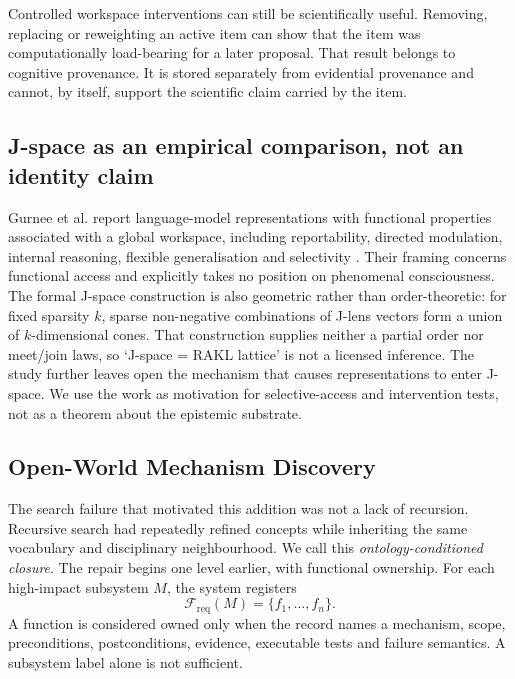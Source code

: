 Controlled workspace interventions can still be scientifically useful. Removing, replacing or reweighting an active item can show that the item was computationally load-bearing for a later proposal. That result belongs to cognitive provenance. It is stored separately from evidential provenance and cannot, by itself, support the scientific claim carried by the item.

\subsection{J-space as an empirical comparison, not an identity claim}

Gurnee et al. report language-model representations with functional properties associated with a global workspace, including reportability, directed modulation, internal reasoning, flexible generalisation and selectivity \cite{gurnee2026}. Their framing concerns functional access and explicitly takes no position on phenomenal consciousness. The formal J-space construction is also geometric rather than order-theoretic: for fixed sparsity \(k\), sparse non-negative combinations of J-lens vectors form a union of \(k\)-dimensional cones. That construction supplies neither a partial order nor meet/join laws, so `J-space = RAKL lattice' is not a licensed inference. The study further leaves open the mechanism that causes representations to enter J-space. We use the work as motivation for selective-access and intervention tests, not as a theorem about the epistemic substrate.

\subsection{Open-World Mechanism Discovery}

The search failure that motivated this addition was not a lack of recursion. Recursive search had repeatedly refined concepts while inheriting the same vocabulary and disciplinary neighbourhood. We call this \emph{ontology-conditioned closure}. The repair begins one level earlier, with functional ownership. For each high-impact subsystem \(M\), the system registers
\[
\mathcal F_{\mathrm{req}}(M)=\{f_1,\ldots,f_n\}.
\]
A function is considered owned only when the record names a mechanism, scope, preconditions, postconditions, evidence, executable tests and failure semantics. A subsystem label alone is not sufficient.

